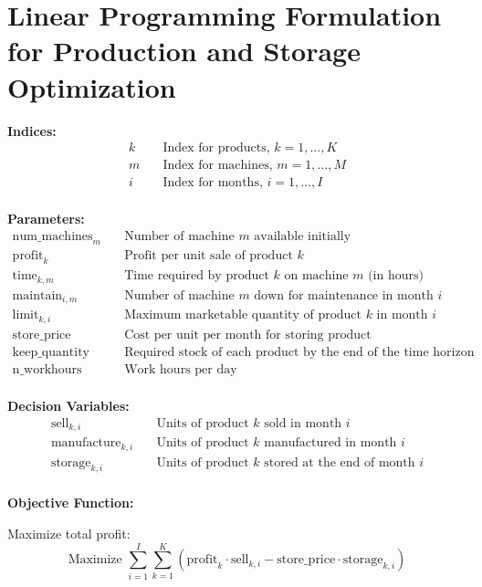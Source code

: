 \documentclass{article}
\begin{document}
\section*{Linear Programming Formulation for Production and Storage Optimization}

\textbf{Indices:}
\begin{align*}
k & \quad \text{Index for products, } k = 1, \dots, K \\
m & \quad \text{Index for machines, } m = 1, \dots, M \\
i & \quad \text{Index for months, } i = 1, \dots, I \\
\end{align*}

\textbf{Parameters:}
\begin{align*}
\text{num\_machines}_m & \quad \text{Number of machine $m$ available initially} \\
\text{profit}_k & \quad \text{Profit per unit sale of product $k$} \\
\text{time}_{k,m} & \quad \text{Time required by product $k$ on machine $m$ (in hours)} \\
\text{maintain}_{i,m} & \quad \text{Number of machine $m$ down for maintenance in month $i$} \\
\text{limit}_{k,i} & \quad \text{Maximum marketable quantity of product $k$ in month $i$} \\
\text{store\_price} & \quad \text{Cost per unit per month for storing product} \\
\text{keep\_quantity} & \quad \text{Required stock of each product by the end of the time horizon} \\
\text{n\_workhours} & \quad \text{Work hours per day} \\
\end{align*}

\textbf{Decision Variables:}
\begin{align*}
\text{sell}_{k,i} & \quad \text{Units of product $k$ sold in month $i$} \\
\text{manufacture}_{k,i} & \quad \text{Units of product $k$ manufactured in month $i$} \\
\text{storage}_{k,i} & \quad \text{Units of product $k$ stored at the end of month $i$} \\
\end{align*}

\textbf{Objective Function:}

Maximize total profit:
\[
\text{Maximize } \sum_{i=1}^{I} \sum_{k=1}^{K} \left( \text{profit}_k \cdot \text{sell}_{k,i} - \text{store\_price} \cdot \text{storage}_{k,i} \right)
\]
\end{document}
